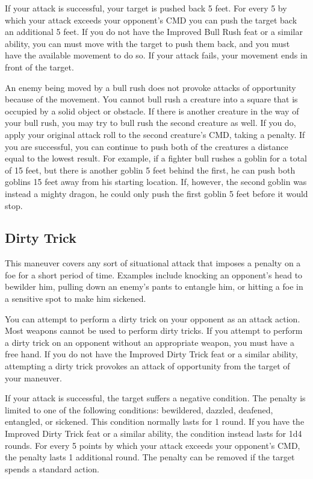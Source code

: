 If your attack is successful, your target is pushed back 5 feet. For every 5 by which your attack exceeds your opponent's CMD you can push the target back an additional 5 feet. If you do not have the Improved Bull Rush feat or a similar ability, you can must move with the target to push them back, and you must have the available movement to do so. If your attack fails, your movement ends in front of the target.

An enemy being moved by a bull rush does not provoke attacks of opportunity because of the movement. You cannot bull rush a creature into a square that is occupied by a solid object or obstacle. If there is another creature in the way of your bull rush, you may try to bull rush the second creature as well. If you do, apply your original attack roll to the second creature's CMD, taking a  penalty. If you are successful, you can continue to push both of the creatures a distance equal to the lowest result. For example, if a fighter bull rushes a goblin for a total of 15 feet, but there is another goblin 5 feet behind the first, he can push both goblins 15 feet away from his starting location. If, however, the second goblin was instead a mighty dragon, he could only push the first goblin 5 feet before it would stop.

\subsection{Dirty Trick}
This maneuver covers any sort of situational attack that imposes a penalty on a foe for a short period of time. Examples include knocking an opponent's head to bewilder him, pulling down an enemy's pants to entangle him, or hitting a foe in a sensitive spot to make him sickened.

\par You can attempt to perform a dirty trick on your opponent as an attack action. Most weapons cannot be used to perform dirty tricks. If you attempt to perform a dirty trick on an opponent without an appropriate weapon, you must have a free hand. If you do not have the Improved Dirty Trick feat or a similar ability, attempting a dirty trick provokes an attack of opportunity from the target of your maneuver.

\par If your attack is successful, the target suffers a negative condition. The penalty is limited to one of the following conditions: bewildered, dazzled, deafened, entangled, or sickened. This condition normally lasts for 1 round. If you have the Improved Dirty Trick feat or a similar ability, the condition instead lasts for 1d4 rounds. For every 5 points by which your attack exceeds your opponent's CMD, the penalty lasts 1 additional round. The penalty can be removed if the target spends a standard action.

